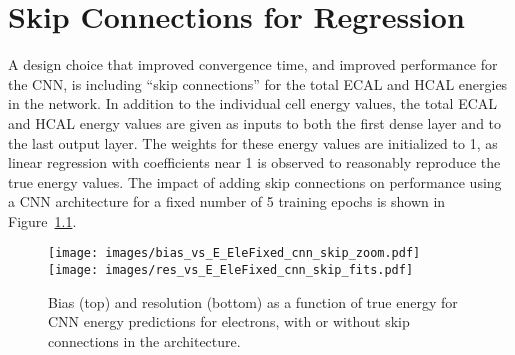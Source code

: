 \chapter{Skip Connections for Regression}\label{app:skip_connections}

A design choice that improved convergence time, and improved performance for the CNN, is including ``skip connections'' for the total ECAL and HCAL energies in the network.  In addition to the individual cell energy values, the total ECAL and HCAL energy values are given as inputs to both the first dense layer and to the last output layer.  The weights for these energy values are initialized to 1, as linear regression with coefficients near 1 is observed to reasonably reproduce the true energy values.  The impact of adding skip connections on performance using a CNN architecture for a fixed number of 5 training epochs is shown in Figure~\ref{fig:reg_cnn_skip}.

\begin{figure}[htbp]
\centering
\texttt{[image: images/bias\_vs\_E\_EleFixed\_cnn\_skip\_zoom.pdf]}
\texttt{[image: images/res\_vs\_E\_EleFixed\_cnn\_skip\_fits.pdf]}
\caption{Bias (top) and resolution (bottom) as a function of true energy for CNN energy predictions for electrons, with or without skip connections in the architecture.
}
\label{fig:reg_cnn_skip}
\end{figure}